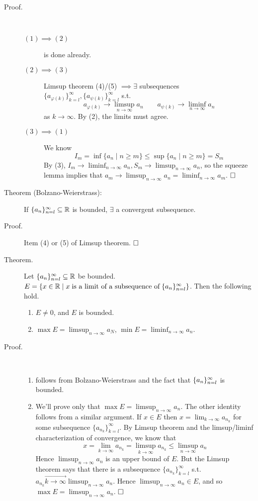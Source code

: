\documentclass[letterpaper,11pt]{article}
\begin{document}
\begin{description}
\item[Proof.]\text{}\vspace{-0.2in}\\
  \begin{description}
  \item[$(1)\implies(2)$] is done already.
  \item[$(2)\implies(3)$] Limsup theorem (4)/(5)
      $\implies\exists$ subsequences
       $\{a_{\varphi(k)}\}_{k=l}^\infty,
        \{a_{\psi(k)}\}_{k=l}^\infty$ s.t.\
       \[
       a_{\varphi(k)} \to \limsup_{n\to\infty}a_n \qquad
       a_{\psi(k)} \to \liminf_{n\to\infty}a_n
       \]
       as $k\to\infty$. By (2), the limits must agree.
  \item[$(3)\implies(1)$] We know \[
      I_m=\inf\{a_n\;|\;n\ge m\}\le \sup\{a_n\;|\;n\ge m\}=S_m
      \]
      By (3), $I_m\to\liminf_{n\to\infty}a_n, S_m\to\limsup_{n\to\infty}a_n$,
      so the squeeze lemma implies that
      $a_m\to\limsup_{n\to\infty}a_n=\liminf_{n\to\infty}a_m$.
      $\hfill\square$
  \end{description}


\item[Theorem (Bolzano-Weierstrass):] If $\{a_n\}_{n=l}^\infty\subseteq\mathbb{R}$ is bounded,
    $\exists$ a convergent subsequence.

\item[Proof.] Item (4) or (5) of Limsup theorem. $\hfill\square$


\item[Theorem.] Let $\{a_n\}_{n=l}^\infty\subseteq\mathbb{R}$ be bounded.
    $E=\{x\in\mathbb{R}\;|\;x\;\text{is a limit of a subsequence of}\;\{a_n\}_{n=l}^\infty\}$.
    Then the following hold.
    \begin{enumerate}[1)]
    \item $E\ne0$, and $E$ is bounded.
    \item $\max E=\limsup_{n\to\infty} a_N$, $\min E=\liminf_{n\to\infty}a_n$.
    \end{enumerate}

\item[Proof.]\text{}\vspace{-0.2in}\\
  \begin{enumerate}[1)]
  \item follows from Bolzano-Weierstrass and the fact that $\{a_n\}_{n=l}^\infty$ is bounded.
  \item We'll prove only that $\max E=\limsup_{n\to\infty}a_n$. The other
      identity follows from a similar argument. If $x\in E$ then
      $x=\lim_{k\to\infty}a_{n_k}$ for some subsequence
      $\{a_{n_k}\}_{k=l}^\infty$. By Limsup theorem and the limsup/liminf
      characterization of convergence, we know that
      \[
      x=\lim_{k\to\infty}a_{n_k} =
      \limsup_{k\to\infty}a_{n_k} \le
      \limsup_{n\to\infty}a_n
      \]
      Hence $\limsup_{n\to\infty}a_n$ is an upper bound of $E$.
      But the Limsup theorem says that there is a subsequence
      $\{a_{n_k}\}_{k=l}^\infty$ s.t.\
      $a_{n_k}\stackrel{\to}{k\to\infty}\limsup_{n\to\infty}a_n$.
      Hence $\limsup_{n\to\infty}a_n\in E$, and so
      $\max E=\limsup_{n\to\infty}a_n$. $\hfill\square$
  \end{enumerate}
\end{description}
\end{document}

